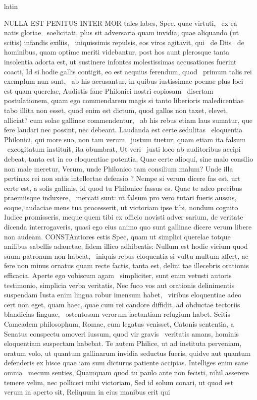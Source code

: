 \documentclass[12pt]{book}
\renewenvironment{latin}
    	{\begin{hyphenrules}{latin}}
    	{\end{hyphenrules}}
\begin{document}
\begin{pages}
\begin{latin}
\begin{Leftside}
                    NULLA EST PENITUS INTER MOR tales labes, Spec. quae virtuti, ﻿\ampersand\ ex ea natis gloriae ﻿\ampersand\ soelicitati, plus sit adversaria quam invidia, quae aliquando (ut scitis) infandis exiliis, ﻿\ampersand\ iniquissimis repulsis, eos viros agitavit, qui ﻿\ampersand\ de Diis ﻿\ampersand\ de hominibus, quam optime meriti videbantur, post hos aunt plerosque tanta insolentia adorta est, ut sustinere infontes molestissimas accusationes fuerint coacti, Id si hodie gallis contigit, eo est aequius ferendum, quod ﻿\ampersand\ primum talis rei exemplum nun sunt, ﻿\ampersand\ ab his accusantur, in quibus iustissimae poenae plus loci est quam querelae, Audistis fane Philonici nostri copiosam ﻿\ampersand\ disertam postulationem, quam ego commendarem magis si tanto liberioris maledicentiae tabo illita non esset, quod enim est dictum, quod gallos non taxet, elevet, alliciat? cum solae gallinae commendentur, ﻿\ampersand\ ab his rebus etiam laus sumatur, que fere laudari nec possint, nec debeant. Laudanda est certe sedulitas ﻿\ampersand\ eloquentia Philonici, qui more suo, non tam verum ﻿\ampersand\ justum tuetur, quam etiam ita falsum ﻿\ampersand\ excogitatum instituit, ita obumbrat, Ut veri ﻿\ampersand\ justi loco ab auditoribus accipi debeat, tanta est in eo eloquentiae potentia, Quae certe alioqui, sine malo consilio non male meretur, Verum, unde Philonico tam consilium malum? Unde illa pertinax rei non satis intellectae defensio ?   Nempe si verum dicere fas est, urt certe est, a solis gallinis, id quod tu Philonice fassus es. Quae te adeo precibus praemiisque induxere, ﻿\ampersand\ mercati sunt: ut falsum pro vero tutari fueris aussus, eoque, audaciae mens tua processerit, ut victoriam ipse tibi, nondum cognito Iudice promisseris, meque quem tibi ex officio novisti adver sarium, de veritate dicenda interrogaveris, quasi ego eius animo quo sunt gallinae dicere verum libere non audeam. CONSTAntiores estis Spec, quam ut simplici querelae totque anilibus sabellis adauctae, fidem illico adhibeatis: Nullum est hodie vicium quod suum patronum non habeat, ﻿\ampersand\ iniquis rebus eloquentia si vultu multum affert, ac fere non minus ornatus quam recte factis, tanta est, delini tae illecebris orationis efficacia. Aperte ego vobiscum agam ﻿\ampersand\ simpliciter, sunt enim vetusti autoris testimonio, simplicia verba veritatis, Nec fuco vos aut orationis delinimentis suspendam Iusta enim lingua robur imensum habet, ﻿\ampersand\ viribus eloquentiae adeo cert non eget, quam haec, quae cum rei candore diffidit, ad obductae tectoriis blandicias linguae, ﻿\ampersand\ ostentosam verorum iactantiam refugium habet. Scitis Cameadem philosophum, Romae, cum legatus venisset, Catonis sententia, a Senatus conspectu amoveri iussum, quod vir gravis ﻿\ampersand\ veritatis amans, hominis eloquentiam suspectam habebat. Te autem Philice, ut ad instituta perveniam, oratum volo, ut quantum gallinarum invidia seductus fueris, quidve aut quantum defenderis ex hisce quae iam sum dicturus patiente accipias. Intelliges enim sane omnia ﻿\ampersand\ mecum senties, Quamquam quod tu paulo ante non fecisti, nihil asserere temere velim, nec polliceri mihi victoriam, Sed id solum conari, ut quod est verum in aperto sit, Reliquum in eius manibus erit qui 
\end{Leftside}
\end{latin}
\end{pages}
\end{document}
